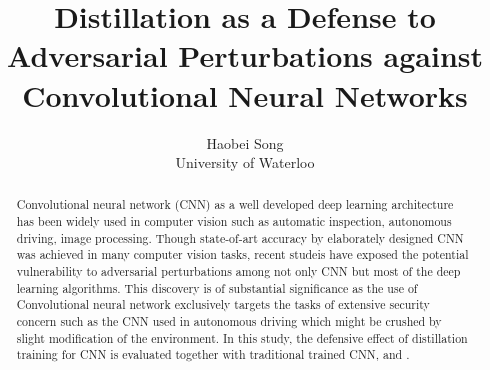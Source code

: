 \documentclass{article}
\title{Distillation as a Defense to Adversarial Perturbations against Convolutional Neural Networks}
\author{Haobei Song \\
        University of Waterloo}
\begin{document}
\maketitle
{}
\newpage
{}

\begin{abstract}
	Convolutional neural network (CNN) as a well developed deep learning architecture has been widely used in computer vision such as automatic inspection, autonomous driving, image processing. 
	Though state-of-art accuracy by elaborately designed CNN was achieved in many computer vision tasks, 
	recent studeis have exposed the potential vulnerability to adversarial perturbations among not only CNN but most of the deep learning algorithms.
	This discovery is of substantial significance as the use of Convolutional neural network exclusively targets the tasks of extensive security concern
	such as the CNN used in autonomous driving which might be crushed by slight modification of the environment. 
	In this study, the defensive effect of distillation training for CNN is evaluated together with traditional trained CNN, and .
\end{abstract}
\end{document}
